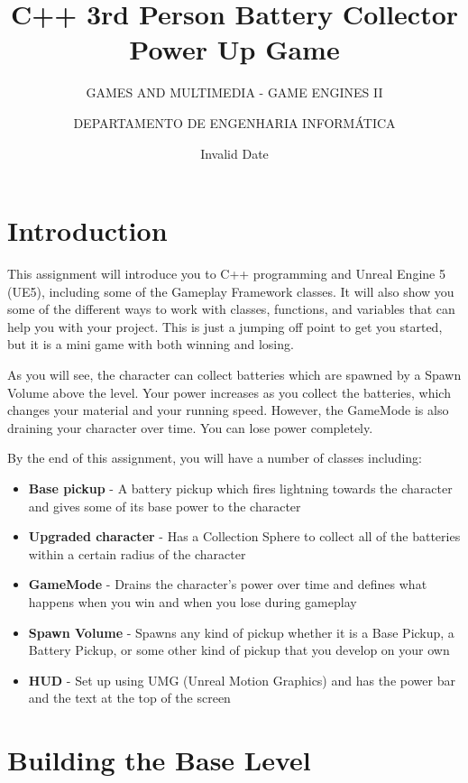 \documentclass[
  letterpaper,
  DIV=11,
  numbers=noendperiod]{scrartcl}
\title{C++ 3rd Person Battery Collector Power Up Game}
\subtitle{GAMES AND MULTIMEDIA - GAME ENGINES II}
\author{DEPARTAMENTO DE ENGENHARIA INFORMÁTICA}
\date{Invalid Date}
\providecommand{\tightlist}{%
  \setlength{\itemsep}{0pt}\setlength{\parskip}{0pt}}
\renewcommand*\contentsname{Table of contents}
\newcommand\contentsname{Table of contents}
\begin{document}
\maketitle

\renewcommand*\contentsname{Table of contents}
{
\hypersetup{linkcolor=}
\setcounter{tocdepth}{3}
\tableofcontents
}

\section{Introduction}\label{introduction}

This assignment will introduce you to C++ programming and Unreal Engine
5 (UE5), including some of the Gameplay Framework classes. It will also
show you some of the different ways to work with classes, functions, and
variables that can help you with your project. This is just a jumping
off point to get you started, but it is a mini game with both winning
and losing.

As you will see, the character can collect batteries which are spawned
by a Spawn Volume above the level. Your power increases as you collect
the batteries, which changes your material and your running speed.
However, the GameMode is also draining your character over time. You can
lose power completely.

By the end of this assignment, you will have a number of classes
including:

\begin{itemize}
\tightlist
\item
  \textbf{Base pickup} - A battery pickup which fires lightning towards
  the character and gives some of its base power to the character
\item
  \textbf{Upgraded character} - Has a Collection Sphere to collect all
  of the batteries within a certain radius of the character
\item
  \textbf{GameMode} - Drains the character's power over time and defines
  what happens when you win and when you lose during gameplay
\item
  \textbf{Spawn Volume} - Spawns any kind of pickup whether it is a Base
  Pickup, a Battery Pickup, or some other kind of pickup that you
  develop on your own
\item
  \textbf{HUD} - Set up using UMG (Unreal Motion Graphics) and has the
  power bar and the text at the top of the screen
\end{itemize}

\section{Building the Base Level}\label{building-the-base-level}
\end{document}
